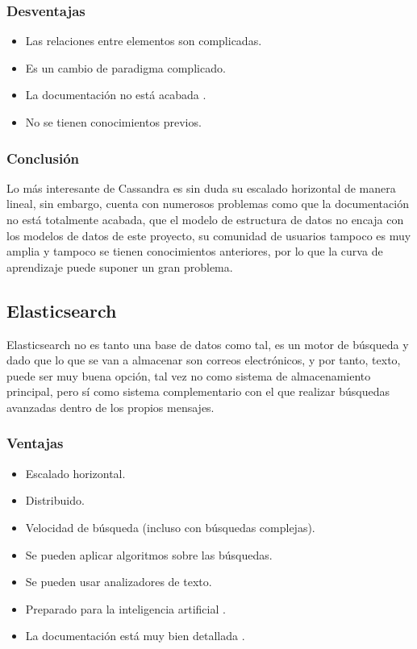 \subsubsection{Desventajas}
\begin{itemize}
    \item Las relaciones entre elementos son complicadas.
    \item Es un cambio de paradigma complicado.
    \item La documentación no está acabada \cite{Apache_Cassandra_docu}.
    \item No se tienen conocimientos previos.
\end{itemize}
\subsubsection{Conclusión}
Lo más interesante de Cassandra es sin duda su escalado horizontal de manera lineal, sin embargo, cuenta con numerosos problemas como que la documentación no está totalmente acabada, que el modelo de estructura de datos no encaja con los modelos de datos de este proyecto, su comunidad de usuarios tampoco es muy amplia y tampoco se tienen conocimientos anteriores, por lo que la curva de aprendizaje puede suponer un gran problema. 

\subsection{Elasticsearch}
Elasticsearch\cite{Elasticsearch} no es tanto una base de datos como tal, es un motor de búsqueda y dado que lo que se van a almacenar son correos electrónicos, y por tanto, texto, puede ser muy buena opción, tal vez no como sistema de almacenamiento principal, pero sí como sistema complementario con el que realizar búsquedas avanzadas dentro de los propios mensajes. 

\subsubsection{Ventajas}
\begin{itemize}
    \item Escalado horizontal.
    \item Distribuido.
    \item Velocidad de búsqueda (incluso con búsquedas complejas).
    \item Se pueden aplicar algoritmos sobre las búsquedas.
    \item Se pueden usar analizadores de texto.
    \item Preparado para la inteligencia artificial \cite{Elasticsearch_IA}.
    \item La documentación está muy bien detallada \cite{Elasticsearch_docu}.
\end{itemize}
